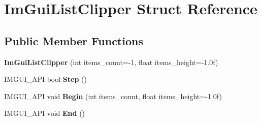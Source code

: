 \hypertarget{struct_im_gui_list_clipper}{}\section{Im\+Gui\+List\+Clipper Struct Reference}
\label{struct_im_gui_list_clipper}
\subsection*{Public Member Functions}
\begin{DoxyCompactItemize}
\item 
\mbox{\label{struct_im_gui_list_clipper_a0dc870fa31a56d3ace7625450f42937a}} 
{\bfseries Im\+Gui\+List\+Clipper} (int items\+\_\+count=-\/1, float items\+\_\+height=-\/1.\+0f)
\item 
\mbox{\label{struct_im_gui_list_clipper_ac3e115812c3c4e5a39578a7aa955379a}} 
I\+M\+G\+U\+I\+\_\+\+A\+PI bool {\bfseries Step} ()
\item 
\mbox{\label{struct_im_gui_list_clipper_a746fbd724a41dbe88fef4875a2b1e9c7}} 
I\+M\+G\+U\+I\+\_\+\+A\+PI void {\bfseries Begin} (int items\+\_\+count, float items\+\_\+height=-\/1.\+0f)
\item 
\mbox{\label{struct_im_gui_list_clipper_a3e6aec0db317985319a78513fc2c8068}} 
I\+M\+G\+U\+I\+\_\+\+A\+PI void {\bfseries End} ()
\end{DoxyCompactItemize}
